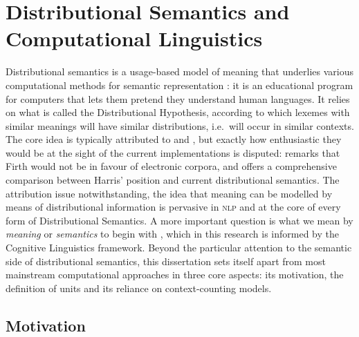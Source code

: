 \documentclass[
]{book}
\begin{document}
\hypertarget{comp}{%
\section{Distributional Semantics and Computational Linguistics}\label{comp}}

Distributional semantics is a usage-based model of meaning that underlies various computational methods for semantic representation
\autocite{sahlgren_2008,lenci_2018}: it is an educational program for computers that lets them pretend they understand human languages. It relies on what is called the Distributional Hypothesis, according to which lexemes with similar meanings will have similar distributions, i.e.~will occur in similar contexts. The core idea is typically attributed to \textcite{harris_1954} and \textcite{firth_1957a}, but exactly how enthusiastic they would be at the sight of the current implementations is disputed: \textcite[157]{tognini-bonelli_2001} remarks that Firth would not be in favour of electronic corpora, and \textcite{geeraerts_2017} offers a comprehensive comparison between Harris' position and current distributional semantics. The attribution issue notwithstanding, the idea that meaning can be modelled by means of distributional information is pervasive in \textsc{nlp} and at the core of every form of Distributional Semantics. A more important question is what we mean by \emph{meaning} or \emph{semantics} to begin with \autocite{sahlgren_2006,lenci_2008}, which in this research is informed by the Cognitive Linguistics framework. Beyond the particular attention to the semantic side of distributional semantics, this dissertation sets itself apart from most mainstream computational approaches in three core aspects: its motivation, the definition of units and its reliance on context-counting models.

\hypertarget{motivation}{%
\subsection{Motivation}\label{motivation}}
\end{document}
